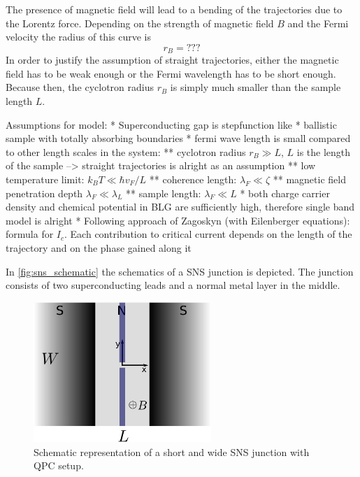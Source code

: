 The presence of magnetic field will lead to a bending of the trajectories due to the Lorentz force. Depending on the strength of magnetic field $B$ and the Fermi velocity the radius of this curve is 
\begin{equation}
r_B = ???
\end{equation}
In order to justify the assumption of straight trajectories, either the magnetic field has to be weak enough or the Fermi wavelength has to be short enough. Because then, the cyclotron radius $r_B$ is simply much smaller than the sample length $L$.



Assumptions for model:
* Superconducting gap is stepfunction like
* ballistic sample with totally absorbing boundaries
* fermi wave length is small compared to other length scales in the system: 
** cyclotron radius $r_B \gg L$, $L$ is the length of the sample --> straight trajectories is alright as an assumption
** low temperature limit: $k_B T \ll \hbar v_F / L$ 
** coherence length: $\lambda_F \ll \zeta$
** magnetic field penetration depth $\lambda_F \ll \lambda_L$
** sample length: $\lambda_F \ll L$
* both charge carrier density and chemical potential in BLG are sufficiently high, therefore single band model is alright
* Following approach of Zagoskyn (with Eilenberger equations): formula for $I_c$. Each contribution to critical current depends on the length of the trajectory and on the phase gained along it

In \ref{fig:sns_schematic} the schematics of a SNS junction is depicted. The junction consists of two superconducting leads and a normal metal layer in the middle. 

\begin{figure}
\centering
\includegraphics[width=0.6\textwidth]{figure/analyticalmodel/qpc_sns_junction.pdf}
\caption{Schematic representation of a short and wide SNS junction with QPC setup.}
\label{fig:qpc_sns_schematic}
\end{figure}